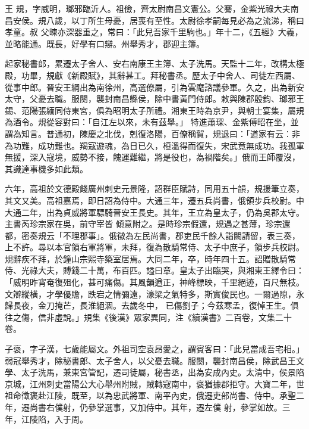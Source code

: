 
\begin{pinyinscope}

 王
 規，字威明，瑯邪臨沂人。祖儉，齊太尉南昌文憲公。父騫，金紫光祿大夫南昌安侯。規八歲，以丁所生母憂，居喪有至性。太尉徐孝嗣每見必為之流涕，稱曰孝童。叔
 父暕亦深器重之，常曰：「此兒吾家千里駒也。」年十二，《五經》大義，並略能通。既長，好學有口辯。州舉秀才，郡迎主簿。



 起家秘書郎，累遷太子舍人、安右南康王主簿、太子洗馬。天監十二年，改構太極殿，功畢，規獻《新殿賦》，其辭甚工。拜秘書丞。歷太子中舍人、司徒左西屬、從事中郎。晉安王綱出為南徐州，高選僚屬，引為雲麾諮議參軍。久之，出為新安太守，父憂去職。服闋，襲封南昌縣侯，除中書黃門侍郎。敕與陳郡殷鈞、瑯邪王錫、范陽張緬同侍東宮，俱為昭明太子所禮。湘東王時為京尹，與朝士宴集，屬規為酒令。規從容對曰：「自江左以來，未有茲舉。」
 特進蕭琛、金紫傅昭在坐，並謂為知言。普通初，陳慶之北伐，剋復洛陽，百僚稱賀，規退曰：「道家有云：非為功難，成功難也。羯寇遊魂，為日已久，桓溫得而復失，宋武竟無成功。我孤軍無援，深入寇境，威勢不接，餽運難繼，將是役也，為禍階矣。」俄而王師覆沒，其識達事機多如此類。



 六年，高祖於文德殿餞廣州刺史元景隆，詔群臣賦詩，同用五十韻，規援筆立奏，其文又美。高祖嘉焉，即日詔為侍中。大通三年，遷五兵尚書，俄領步兵校尉。中大通二年，出為貞威將軍驃騎晉安王長史。其年，王立為皇太子，仍為吳郡太守。主書芮珍宗家在吳，前守宰皆
 傾意附之。是時珍宗假還，規遇之甚薄，珍宗還都，密奏規云「不理郡事」。俄徵為左民尚書，郡吏民千餘人詣闕請留，表三奏，上不許。尋以本官領右軍將軍，未拜，復為散騎常侍、太子中庶子，領步兵校尉。規辭疾不拜，於鐘山宗熙寺築室居焉。大同二年，卒，時年四十五。詔贈散騎常侍、光祿大夫，賻錢二十萬，布百匹。謚曰章。皇太子出臨哭，與湘東王繹令曰：「威明昨宵奄復殂化，甚可痛傷。其風韻遒正，神峰標映，千里絕迹，百尺無枝。文辯縱橫，才學優贍，跌宕之情彌遠，濠梁之氣特多，斯實俊民也。一爾過隙，永歸長夜，金刀掩芒，長淮絕涸。去歲冬中，
 已傷劉子；今茲寒孟，復悼王生。俱往之傷，信非虛說。」規集《後漢》眾家異同，注《續漢書》二百卷，文集二十卷。



 子褒，字子漢，七歲能屬文。外祖司空袁昂愛之，謂賓客曰：「此兒當成吾宅相。」弱冠舉秀才，除秘書郎、太子舍人，以父憂去職。服闋，襲封南昌侯，除武昌王文學、太子洗馬，兼東宮管記，遷司徒屬，秘書丞，出為安成內史。太清中，侯景陷京城，江州刺史當陽公大心舉州附賊，賊轉寇南中，褒猶據郡拒守。大寶二年，世祖命徵褒赴江陵，既至，以為忠武將軍、南平內史，俄遷吏部尚書、侍中。承聖二年，遷尚書右僕射，仍參掌選事，又加侍中。其年，遷左僕
 射，參掌如故。三年，江陵陷，入于周。




\end{pinyinscope}

